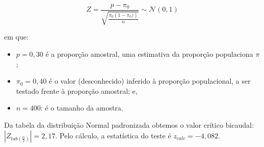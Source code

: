 \documentclass[
]{book}
\providecommand{\tightlist}{%
  \setlength{\itemsep}{0pt}\setlength{\parskip}{0pt}}
\begin{document}
\hfill\break

\[
Z=\frac{p-\pi_{0} }{\sqrt{\frac{\pi_{0} \left(1-\pi_{0}) \right)}{n}}} \sim \mathcal{N}(0,1)
\]

\hfill\break

em que:\\

\begin{itemize}
\tightlist
\item
  \(p=0,30\) é a proporção amostral, uma estimativa da proporção populaciona \(\pi\);\\
\item
  \(\pi_{0}=0,40\) é o valor (desconhecido) inferido à proporção populacional, a ser testado frente à proporção amostral; e,\\
\item
  \(n=400\): é o tamanho da amostra.
\end{itemize}

\hfill\break

Da tabela da distribuição Normal padronizada obtemos o valor crítico bicaudal: \(|{Z}_{tab\left(\frac{\alpha }{2}\right)}|=2,17\). Pelo cálculo, a estatística do teste é \(z_{calc}=-4,082\).

\hfill\break
\end{document}
